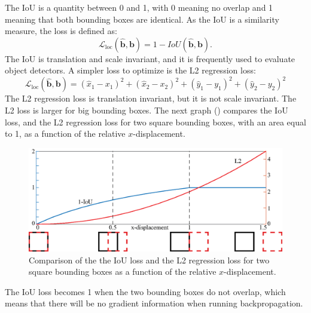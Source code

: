 The IoU is a quantity between 0 and 1, with 0 meaning no overlap and 1 meaning that both bounding boxes are identical. As the IoU is a similarity measure, the loss is defined as:
\begin{equation}
    \mathcal{L}_{\text{loc}} (\hat{\mathbf{b}}, \mathbf{b})= 1-IoU (\hat{\mathbf{b}}, \mathbf{b}).
\end{equation}
The IoU is translation and scale invariant, and it is frequently used to evaluate object detectors. A simpler loss to optimize is the L2 regression loss:
\begin{equation}
    \mathcal{L}_{\text{loc}} (\hat{\mathbf{b}}, \mathbf{b}) = (\hat{x}_1 - x_1)^2 + (\hat{x}_2 - x_2)^2 + (\hat{y}_1 - y_1)^2 + (\hat{y}_2 - y_2)^2
\end{equation}
The L2 regression loss is translation invariant, but it is not scale invariant. The L2 loss is larger for big bounding boxes. The next graph (\fig{\ref{fig:iou_l2_comparison}}) compares the IoU loss, and the L2 regression loss for two square bounding boxes, with an area equal to 1, as a function of the relative $x$-displacement.

\begin{figure}
    \centerline{
        \includegraphics[width=1\linewidth]{figures/object_recognition/iou_l2_comparison.eps}
    }
    \caption{Comparison of the the IoU loss and the L2 regression loss for two square bounding boxes as a function of the relative $x$-displacement.}
    \label{fig:iou_l2_comparison}
\end{figure}

The IoU loss becomes 1 when the two bounding boxes do not overlap, which means that there will be no gradient information when running backpropagation.


